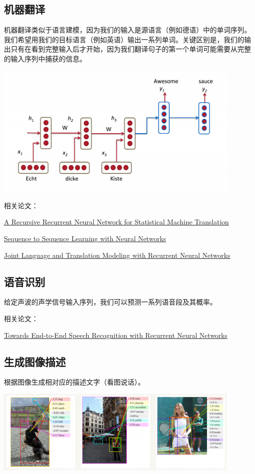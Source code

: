 \documentclass{article}
\begin{document}
\subsection{机器翻译}
机器翻译类似于语言建模，因为我们的输入是源语言（例如德语）中的单词序列。我们希望用我们的目标语言（例如英语）输出一系列单词。关键区别是，我们的输出只有在看到完整输入后才开始，因为我们翻译句子的第一个单词可能需要从完整的输入序列中捕获的信息。\par 
\centerline{\includegraphics[width=12cm]{tran}}
相关论文：\par 
\href{https://www.aclweb.org/anthology/P14-1140.pdf}{A Recursive Recurrent Neural Network
	for Statistical Machine Translation}\par
\href{http://papers.nips.cc/paper/5346-sequence-to-sequence-learning-with-neural-networks.pdf}{Sequence to Sequence Learning with Neural Networks}\par
\href{https://www.microsoft.com/en-us/research/wp-content/uploads/2016/02/EMNLP2013RNNMT.pdf}{Joint Language and Translation Modeling with Recurrent Neural Networks}\par
\subsection{语音识别}
给定声波的声学信号输入序列，我们可以预测一系列语音段及其概率。\par
相关论文：\par 
\href{http://proceedings.mlr.press/v32/graves14.pdf}{Towards End-to-End Speech Recognition
with Recurrent Neural Networks}
\subsection{生成图像描述}
根据图像生成相对应的描述文字（看图说话）。\par 
\centerline{\includegraphics[width=12cm]{GID}}
\end{document}
